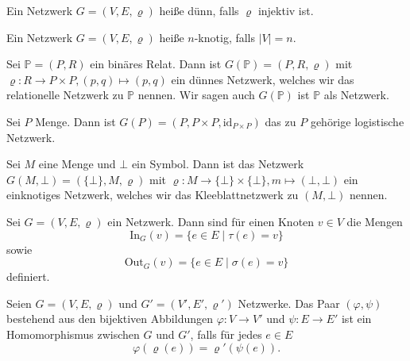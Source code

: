 \documentclass{article}
\begin{document}
\begin{definition}
  Ein Netzwerk $G = (V, E, \varrho)$ heiße dünn, falls $\varrho$ injektiv ist.
\end{definition}

\begin{definition}
  Ein Netzwerk $G = (V, E, \varrho)$ heiße $n$-knotig, falls $|V| = n$. 
\end{definition}

\begin{example}
  Sei $\mathbb{P} = (P, R)$ ein binäres Relat.
  Dann ist $G(\mathbb{P}) = (P, R, \varrho)$ mit $\varrho \colon R \to P \times P, (p, q) \mapsto (p, q)$
  ein dünnes Netzwerk, 
  welches wir das relationelle Netzwerk zu $\mathbb{P}$ nennen.
  Wir sagen auch $G(\mathbb{P})$ ist $\mathbb{P}$ als Netzwerk.
\end{example}

\begin{example}
  Sei $P$ Menge. Dann ist $G(P) = (P, P \times P, \text{id}_{P \times P})$ das zu $P$ gehörige logistische Netzwerk.
\end{example}

\begin{example}
  Sei $M$ eine Menge und $\bot$ ein Symbol.
  Dann ist das Netzwerk $G(M, \bot) = (\{\bot\}, M, \varrho)$
  mit $\varrho \colon M \to \{\bot\} \times \{\bot\}, m \mapsto (\bot, \bot)$
  ein einknotiges Netzwerk, 
  welches wir das Kleeblattnetzwerk zu $(M, \bot)$ nennen.
\end{example}

\begin{definition}
  Sei $G = (V, E, \varrho)$ ein Netzwerk.
  Dann sind für einen Knoten $v \in V$ die Mengen
  \begin{equation*}
    \text{In}_G(v) = \{e \in E \mid \tau(e) = v\}
  \end{equation*}
  sowie
  \begin{equation*}
    \text{Out}_G(v) = \{e \in E \mid \sigma(e) = v\}
  \end{equation*}
  definiert.
\end{definition}

\begin{definition}
  Seien $G = (V, E, \varrho)$ und $G' = (V', E', \varrho')$ Netzwerke.
  Das Paar $(\varphi, \psi)$ bestehend aus den bijektiven Abbildungen $\varphi \colon V \to V'$
  und $\psi \colon E \to E'$ ist ein Homomorphismus zwischen $G$ und $G'$, falls für jedes $e \in E$
  \begin{equation*}
    \varphi(\varrho(e)) = \varrho'(\psi(e)).
  \end{equation*}
\end{definition}
\end{document}
